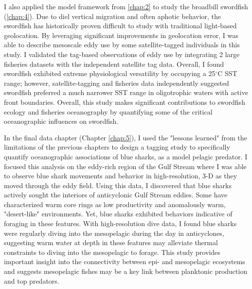 I also applied the model framework from \cref{chap:2} to study the broadbill swordfish (\cref{chap:4}). Due to diel vertical migration and often aphotic behavior, the swordfish has historically proven difficult to study with traditional light-based geolocation. By leveraging significant improvements in geolocation error, I was able to describe mesoscale eddy use by some satellite-tagged individuals in this study. I validated the tag-based observations of eddy use by integrating 2 large fisheries datasets with the independent satellite tag data. Overall, I found swordfish exhibited extreme physiological versatility by occupying a 25$^\circ$C SST range; however, satellite-tagging and fisheries data independently suggested swordfish preferred a much narrower SST range in oligotrophic waters with active front boundaries. Overall, this study makes significant contributions to swordfish ecology and fisheries oceanography by quantifying some of the critical oceanographic influences on swordfish.

In the final data chapter (Chapter \ref{chap:5}), I used the "lessons learned" from the limitations of the previous chapters to design a tagging study to specifically quantify oceanographic associations of blue sharks, as a model pelagic predator. I focused this analysis on the eddy-rich region of the Gulf Stream where I was able to observe blue shark movements and behavior in high-resolution, 3-D as they moved through the eddy field. Using this data, I discovered that blue sharks actively sought the interiors of anticyclonic Gulf Stream eddies. Some have characterized warm core rings as low productivity and anomalously warm, "desert-like" environments. Yet, blue sharks exhibited behaviors indicative of foraging in these features. With high-resolution dive data, I found blue sharks were regularly diving into the mesopelagic during the day in anticyclones, suggesting warm water at depth in these features may alleviate thermal constraints to diving into the mesopelagic to forage. This study provides important insight into the connectivity between epi- and mesopelagic ecosystems and suggests mesopelagic fishes may be a key link between planktonic production and top predators.


